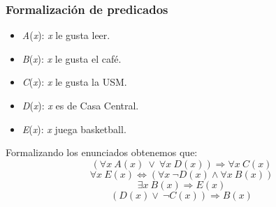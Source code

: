 \documentclass[letterpaper,10pt]{article}
\begin{document}
\subsubsection{Formalizaci\'on de predicados}
\begin{minipage}[t]{0.4\textwidth}
\begin{itemize}
    \item \textit{A}(\textit{x}): \textit{x} le gusta leer.
    \item \textit{B}(\textit{x}): \textit{x} le gusta el café.
    \item \textit{C}(\textit{x}): \textit{x} le gusta la USM.
    \item \textit{D}(\textit{x}): \textit{x} es de Casa Central.
    \item \textit{E}(\textit{x}): \textit{x} juega basketball.
\end{itemize}
\end{minipage}
\vspace{0.4cm}
\newline
\begin{minipage}[t]{0.5\textwidth}
    Formalizando los enunciados obtenemos que:
    \begin{equation}
        ( \forall x \  A(x) \  \vee \  \forall x \  D(x) )\Rightarrow \forall x \  C(x)
    \end{equation}
    \begin{equation}
        \forall x \  E(x) \Leftrightarrow (\forall x \  \neg D(x) \wedge \forall x \  B(x) )
    \end{equation}
    \begin{equation}
        \exists x \  B(x) \Rightarrow E(x)
    \end{equation}
    \begin{equation}
       ( D(x) \vee \  \neg C(x) ) \Rightarrow B(x)
    \end{equation}
    \end{minipage}
\end{document}
